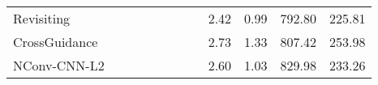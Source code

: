 \documentclass[letterpaper, 10 pt, conference]{ieeeconf}  \usepackage{geometry}
\begin{document}
\begin{table*}[t]
{\begin{tabular}{@{}lccccccccccc@{}}
			\multicolumn{1}{l|}{Revisiting \cite{Revisiting_Sparsity}}                       & \multicolumn{1}{c|}{\checkmark}                                                        & \multicolumn{1}{c|}{\checkmark}                                                              & \multicolumn{1}{c|}{\checkmark}                                                         & \multicolumn{1}{c|}{}                 & \multicolumn{1}{c|}{}                 & \multicolumn{1}{c|}{}                                                                 & \multicolumn{1}{c|}{}                                                                   & 2.42                                                                                 & 0.99                                                                                & 792.80                                                                            & 225.81                                                      \\
			\multicolumn{1}{l|}{CrossGuidance \cite{CrossGuidance}}                    & \multicolumn{1}{c|}{\checkmark}                                                        & \multicolumn{1}{c|}{\checkmark}                                                              & \multicolumn{1}{c|}{}                                                            & \multicolumn{1}{c|}{\checkmark}              & \multicolumn{1}{c|}{}                 & \multicolumn{1}{c|}{}                                                                 & \multicolumn{1}{c|}{}                                                                   & 2.73                                                                                 & 1.33                                                                                & 807.42                                                                            & 253.98                                                      \\
			\multicolumn{1}{l|}{NConv-CNN-L2 \cite{Confidence_L2}}                     & \multicolumn{1}{c|}{\checkmark}                                                        & \multicolumn{1}{c|}{\checkmark}                                                              & \multicolumn{1}{c|}{}                                                            & \multicolumn{1}{c|}{\checkmark}              & \multicolumn{1}{c|}{}                 & \multicolumn{1}{c|}{}                                                                 & \multicolumn{1}{c|}{}                                                                   & 2.60                                                                                 & 1.03                                                                                & 829.98                                                                            & 233.26                                                      \\

\end{tabular}}
\end{table*}
\end{document}
